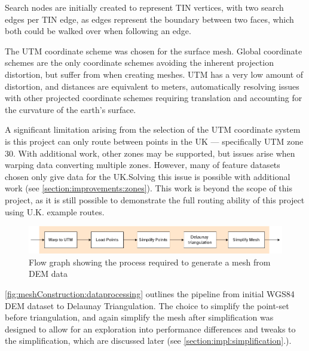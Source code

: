 \documentclass[12pt]{article}
\begin{document}
Search nodes are initially created to represent TIN vertices, with two search edges per TIN edge, as edges represent the boundary between two faces, which both could be walked over when following an edge. %

The UTM coordinate scheme was chosen for the surface mesh. Global coordinate schemes are the only coordinate schemes avoiding the inherent projection distortion, but suffer from %
when creating meshes. UTM has a very low amount of distortion, and distances are equivalent to meters, automatically resolving issues with other projected coordinate schemes requiring translation and accounting for the curvature of the earth's surface.

A significant limitation arising from the selection of the UTM coordinate system is this project can only route between points in the UK --- specifically UTM zone 30. With additional work, other zones may be supported, but issues arise when warping data converting multiple zones. However, many of feature datasets chosen only give data for the UK.\@ Solving this issue is possible with additional work (see \autoref{section:improvements:zones}). This work is beyond the scope of this project, as it is still possible to demonstrate the full routing ability of this project using U.K. example routes.

\begin{figure}[!htbp]
  \centering
  \includegraphics[width=1\textwidth]{assets/meshConstruction-zoomed.png}
  \caption{Flow graph showing the process required to generate a mesh from DEM data}\label{fig:meshConstruction:dataprocessing}
\end{figure}

\autoref{fig:meshConstruction:dataprocessing} outlines the pipeline from initial WGS84 DEM dataset to Delaunay Triangulation. The choice to simplify the point-set before triangulation, and again simplify the mesh after simplification was designed to allow for an exploration into performance differences and tweaks to the simplification, which are discussed later (see \autoref{section:impl:simplification}.).
\end{document}
